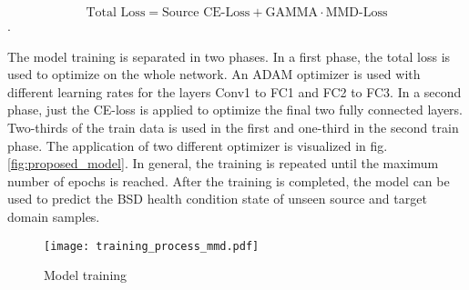 \begin{equation}
    \mbox{Total Loss} = \mbox{Source CE-Loss} + \mbox{GAMMA} \cdot \mbox{MMD-Loss}
\end{equation}.

The model training is separated in two phases. In a first phase, the total loss is used to optimize on the whole network. An ADAM optimizer is used with different learning rates for the layers Conv1 to FC1 and FC2 to FC3. In a second phase, just the CE-loss is applied to optimize the final two fully connected layers. Two-thirds of the train data is used in the first and one-third in the second train phase. The application of two different optimizer is visualized in fig. \ref{fig:proposed_model}. In general, the training is repeated until the maximum number of epochs is reached. After the training is completed, the model can be used to predict the BSD health condition state of unseen source and target domain samples. 

\begin{figure}[H]
  \centering
  \texttt{[image: training\_process\_mmd.pdf]}
  \caption {Model training} \label{fig:Training_Process_MMD}
\end{figure}


